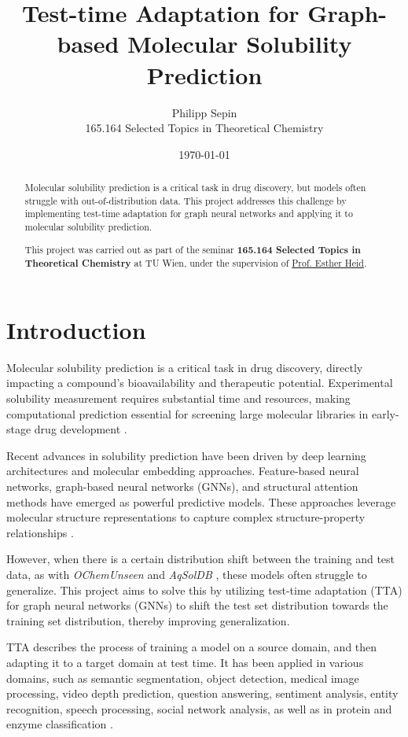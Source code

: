 \documentclass[11pt,a4paper]{article}
\title{Test-time Adaptation for Graph-based Molecular Solubility Prediction}
\author{Philipp Sepin\\
        165.164 Selected Topics in Theoretical Chemistry}
\date{\today}
\begin{document}
\maketitle

\begin{abstract}
        Molecular solubility prediction is a critical task in drug discovery, but models often struggle with out-of-distribution data. This project addresses this challenge by implementing test-time adaptation for graph neural networks and applying it to molecular solubility prediction.

        This project was carried out as part of the seminar \textbf{165.164 Selected Topics in Theoretical Chemistry} at TU Wien, under the supervision of \href{https://hesther.github.io/}{Prof. Esther Heid}.
\end{abstract}

\section{Introduction}
Molecular solubility prediction is a critical task in drug discovery, directly impacting a compound's bioavailability and therapeutic potential. Experimental solubility measurement requires substantial time and resources, making computational prediction essential for screening large molecular libraries in early-stage drug development \cite{llompart2024will}.

Recent advances in solubility prediction have been driven by deep learning architectures and molecular embedding approaches. Feature-based neural networks, graph-based neural networks (GNNs), and structural attention methods have emerged as powerful predictive models. These approaches leverage molecular structure representations to capture complex structure-property relationships \cite{llompart2024will}.

However, when there is a certain distribution shift between the training and test data, as with \textit{OChemUnseen} \cite{llompart2024will} and \textit{AqSolDB} \cite{sorkun2019aqsoldb}, these models often struggle to generalize. This project aims to solve this by utilizing test-time adaptation (TTA) for graph neural networks (GNNs) to shift the test set distribution towards the training set distribution, thereby improving generalization.

TTA describes the process of training a model on a source domain, and then adapting it to a target domain at test time. It has been applied in various domains, such as semantic segmentation, object detection, medical image processing, video depth prediction, question answering, sentiment analysis, entity recognition, speech processing, social network analysis, as well as in protein and enzyme classification \cite{liang2025comprehensive,cui2025online}.
\end{document}
